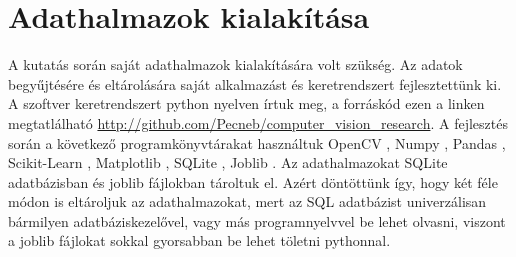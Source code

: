 \documentclass[12pt,a4paper]{article}
\begin{document}
\newpage
\section{Adathalmazok kialakítása}
A kutatás során saját adathalmazok kialakítására volt szükség. Az adatok begyűjtésére és eltárolására saját alkalmazást és keretrendszert
fejlesztettünk ki. A szoftver keretrendszert python nyelven írtuk meg, a forráskód ezen a linken megtatlálható \url{http://github.com/Pecneb/computer_vision_research}.
A fejlesztés során a következő programkönyvtárakat használtuk OpenCV \cite{opencv_library}, Numpy \cite{harris2020array}, Pandas \cite{reback2020pandas},
Scikit-Learn \cite{scikit-learn}, Matplotlib \cite{Hunter:2007}, SQLite \cite{sqlite2020hipp}, Joblib \cite{joblib_library}. Az adathalmazokat SQLite adatbázisban és
joblib fájlokban tároltuk el. Azért döntöttünk így, hogy két féle módon is eltároljuk az adathalmazokat, mert az SQL adatbázist univerzálisan
bármilyen adatbáziskezelővel, vagy más programnyelvvel be lehet olvasni, viszont a joblib fájlokat sokkal gyorsabban be lehet töletni pythonnal.
\end{document}
